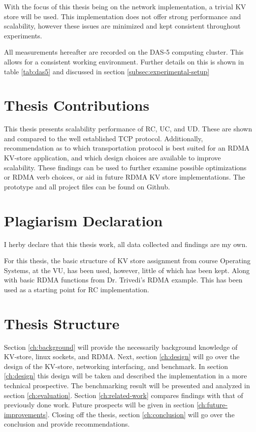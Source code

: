 With the focus of this thesis being on the network implementation, a trivial KV store will be used.
This implementation does not offer strong performance and scalability, however these issues are minimized and kept consistent throughout experiments.

All measurements hereafter are recorded on the DAS-5 computing cluster.
This allows for a consistent working environment.
Further details on this is shown in table \ref{tab:das5} and discussed in section \ref{subsec:experimental-setup}

\section{Thesis Contributions}
This thesis presents scalability performance of RC, UC, and UD.
These are shown and compared to the well established TCP protocol.
Additionally, recommendation as to which transportation protocol is best suited for an RDMA KV-store application, and which design choices are available to improve scalability.
These findings can be used to further examine possible optimizations or RDMA verb choices, or aid in future RDMA KV store implementations.
The prototype and all project files can be found on Github\cite{github}.

\section{Plagiarism Declaration}
I herby declare that this thesis work, all data collected and findings are my own.

For this thesis, the basic structure of KV store assignment from course Operating Systems, at the VU, has been used, however, little of which has been kept.
Along with basic RDMA functions from Dr. Trivedi's RDMA example\cite{rdma_example}.
This has been used as a starting point for RC implementation.

\section{Thesis Structure}
Section \ref{ch:background} will provide the necessarily background knowledge of KV-store, linux sockets, and RDMA.
Next, section \ref{ch:design} will go over the design of the KV-store, networking interfacing, and benchmark.
In section \ref{ch:design} this design will be taken and described the implementation in a more technical prospective.
The benchmarking result will be presented and analyzed in section \ref{ch:evaluation}.
Section \ref{ch:related-work} compares findings with that of previously done work.
Future prospects will be given in section \ref{ch:future-improvements}.
Closing off the thesis, section \ref{ch:conclusion} will go over the conclusion and provide recommendations.
